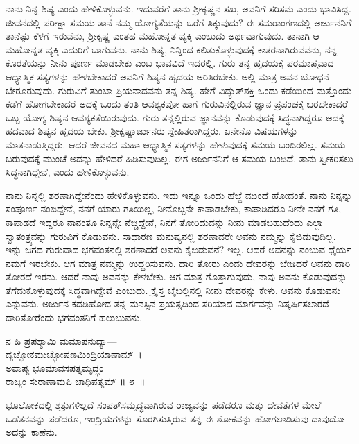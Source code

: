 ನಾನು ನಿನ್ನ ಶಿಷ್ಯ ಎಂದು ಹೇಳಿಕೊಳ್ಳುವನು. ಇದುವರೆಗೆ ತಾನು ಶ‍್ರೀಕೃಷ್ಣನ ಸಖ, ಅವನಿಗೆ ಸರಿಸಮ ಎಂದು ಭಾವಿಸಿದ್ದ. ಜೀವನದಲ್ಲಿ ಪರೀಕ್ಷಾ ಸಮಯ ತಾನೆ ನಮ್ಮ ಯೋಗ್ಯತೆಯನ್ನು ಒರೆಗೆ ತಿಕ್ಕುವುದು? ಈ ಸಮರಾಂಗಣದಲ್ಲಿ ಅರ್ಜುನನಿಗೆ ತಾನೆಷ್ಟು ಕೆಳಗೆ ಇರುವೆನು, ಶ‍್ರೀಕೃಷ್ಣ ಎಂತಹ ಮಹೋನ್ನತ ವ್ಯಕ್ತಿ ಎಂಬುದು ಅರ್ಥವಾಗುವುದು. ತಾನಾಗಿ ಆ ಮಹೋನ್ನತ ವ್ಯಕ್ತಿ ಎದುರಿಗೆ ಬಾಗುವನು. ನಾನು ಶಿಷ್ಯ, ನಿನ್ನಿಂದ ಕಲಿತುಕೊಳ್ಳುವುದಕ್ಕೆ ಕಾತರನಾಗಿರುವವನು, ನನ್ನ ಕೊರತೆಯನ್ನು ನೀನು ಪೂರ್ಣ ಮಾಡಬೇಕು ಎಂಬ ಭಾವವಿದೆ ಇದರಲ್ಲಿ. ಗುರು ತನ್ನ ಹೃದಯಕ್ಕೆ ಪರಮಾಪ್ತವಾದ ಆಧ್ಯಾತ್ಮಿಕ ಸತ್ಯಗಳನ್ನು ಹೇಳಬೇಕಾದರೆ ಅವನಿಗೆ ಶಿಷ್ಯನ ಹೃದಯ ಅರಿತಿರಬೇಕು. ಅಲ್ಲಿ ಮಾತ್ರ ಅವನ ಬೋಧನೆ ಬೇರೂರುವುದು. ಗುರುವಿಗೆ ತುಂಬಾ ಪ್ರಿಯನಾದವನು ತನ್ನ ಶಿಷ್ಯ. ಹೇಗೆ ವಿದ್ಯುತ್​ಶಕ್ತಿ ಒಂದು ಕಡೆಯಿಂದ ಮತ್ತೊಂದು ಕಡೆಗೆ ಹೋಗಬೇಕಾದರೆ ಅದಕ್ಕೆ ಒಂದು ತಂತಿ ಆವಶ್ಯಕವೋ ಹಾಗೆ ಗುರುವಿನಲ್ಲಿರುವ ಜ್ಞಾನ ಪ್ರಪಂಚಕ್ಕೆ ಬರಬೇಕಾದರೆ ಒಬ್ಬ ಯೋಗ್ಯ ಶಿಷ್ಯನ ಆವಶ್ಯಕತೆಯಿರುವುದು. ಗುರು ತನ್ನಲ್ಲಿರುವ ಜ್ಞಾನವನ್ನು ಕೊಡುವುದಕ್ಕೆ ಸಿದ್ಧನಾಗಿದ್ದರೂ ಅದಕ್ಕೆ ಹದವಾದ ಶಿಷ್ಯನ ಹೃದಯ ಬೇಕು. ಶ‍್ರೀಕೃಷ್ಣಾರ್ಜುನರು ಸ್ನೇಹಿತರಾಗಿದ್ದರು. ಏನೇನೊ ವಿಷಯಗಳನ್ನು ಮಾತನಾಡುತ್ತಿದ್ದರು. ಆದರೆ ಜೀವನದ ಮಹಾ ಆಧ್ಯಾತ್ಮಿಕ ಸತ್ಯಗಳನ್ನು ಹೇಳುವುದಕ್ಕೆ ಸಮಯ ಬಂದಿರಲಿಲ್ಲ. ಸಮಯ ಬರುವುದಕ್ಕೆ ಮುಂಚೆ ಅದನ್ನು ಹೇಳಿದರೆ ಹಿಡಿಸುವುದಿಲ್ಲ. ಈಗ ಅರ್ಜುನನಿಗೆ ಆ ಸಮಯ ಬಂದಿದೆ. ತಾನು ಸ್ವೀಕರಿಸಲು ಸಿದ್ಧನಾಗಿದ್ದೇನೆ, ಎಂದು ಹೇಳಿಕೊಳ್ಳುವನು.

ನಾನು ನಿನ್ನಲ್ಲಿ ಶರಣಾಗಿದ್ದೇನೆಂದು ಹೇಳಿಕೊಳ್ಳುವನು. ಇದು ಇನ್ನೂ ಒಂದು ಹೆಜ್ಜೆ ಮುಂದೆ ಹೋದಂತೆ. ನಾನು ನಿನ್ನನ್ನು ಸಂಪೂರ್ಣ ನಂಬಿದ್ದೇನೆ, ನನಗೆ ಯಾರು ಗತಿಯಿಲ್ಲ, ನೀನೊಬ್ಬನೇ ಕಾಪಾಡಬೇಕು, ಕಾಪಾಡಿದರೂ ನೀನೇ ನನಗೆ ಗತಿ, ಕಾಪಾಡದೆ ಇದ್ದರೂ ನಾನಂತೂ ನಿನ್ನನ್ನೇ ನೆಚ್ಚಿದ್ದೇನೆ, ನಿನಗೆ ತೋರಿದುದನ್ನು ನೀನು ಮಾಡಬಹುದೆಂದು ಎಲ್ಲಾ ಸ್ವಾತಂತ್ರ್ಯವನ್ನು ಗುರುವಿಗೆ ಕೊಡುವನು. ಸಾಧಾರಣ ಮನುಷ್ಯನಲ್ಲಿ ಶರಣಾದರೇ ಅವನು ನಮ್ಮನ್ನು ಕೈಬಿಡುವುದಿಲ್ಲ. ಇನ್ನು ಜಗದ ಗುರುವಾದ ಭಗವಂತನಲ್ಲಿ ಶರಣಾದರೆ ಅವನು ಕೈಬಿಡುವನೆ? ಇಲ್ಲ. ಆದರೆ ಅವನನ್ನು ನಂಬುವ ಧೈರ್ಯ ನಮಗೆ ಇರಬೇಕು. ಆಗ ಮಾತ್ರ ನಮ್ಮನ್ನು ಉದ್ಧರಿಸುವನು. ದಾರಿ ತೋರು ಎಂದು ದೇವರನ್ನು ಬೇಡಿದರೆ ಅವನು ದಾರಿ ತೋರದೆ ಇರನು. ಆದರೆ ನಾವು ಅವನನ್ನು ಕೇಳಬೇಕು. ಆಗ ಮಾತ್ರ ಗೊತ್ತಾಗುವುದು, ನಾವು ಅವನು ಕೊಡುವುದನ್ನು ತೆಗೆದುಕೊಳ್ಳುವುದಕ್ಕೆ ಸಿದ್ಧವಾಗಿದ್ದೇವೆ ಎಂಬುದು. ಕ್ರೈಸ್ತ ಬೈಬಲ್ಲಿನಲ್ಲಿ ನೀನು ದೇವರನ್ನು ಕೇಳು, ಅವನು ಕೊಡುವನು ಎನ್ನುವನು. ಅರ್ಜುನ ಕದಡಿಹೋದ ತನ್ನ ಮನಸ್ಸಿನ ಪ್ರಯತ್ನದಿಂದ ಸರಿಯಾದ ಮಾರ್ಗವನ್ನು ನಿಷ್ಕರ್ಷಿಸಲಾರದೆ ದಾರಿತೋರೆಂದು ಭಗವಂತನಿಗೆ ಹಲುಬುವನು.

\begin{shloka}
ನ ಹಿ ಪ್ರಪಶ್ಯಾಮಿ ಮಮಾಪನುದ್ಯಾ—\\ದ್ಯಚ್ಛೋಕಮುಚ್ಛೋಷಣಮಿಂದ್ರಿಯಾಣಾಮ್~।\\ಅವಾಪ್ಯ ಭೂಮಾವಸಪತ್ನಮೃದ್ಧಂ \\ರಾಜ್ಯಂ ಸುರಾಣಾಮಪಿ ಚಾಧಿಪತ್ಯಮ್ \hfill॥ ೮~॥
\end{shloka}

\begin{artha}
ಭೂಲೋಕದಲ್ಲಿ ಶತ್ರುಗಳಿಲ್ಲದೆ ಸಂಪತ್​ಸಮೃದ್ಧವಾಗಿರುವ ರಾಜ್ಯವನ್ನು ಪಡೆದರೂ ಮತ್ತು ದೇವತೆಗಳ ಮೇಲೆ ಒಡೆತನವನ್ನು ಪಡೆದರೂ, ಇಂದ್ರಿಯಗಳನ್ನು ಸೊರಗಿಸುತ್ತಿರುವ ತನ್ನ ಈ ಶೋಕವನ್ನು ಹೋಗಲಾಡಿಸುವು ದಾವುದೋ ಅದನ್ನು ಕಾಣೆನು.
\end{artha}

